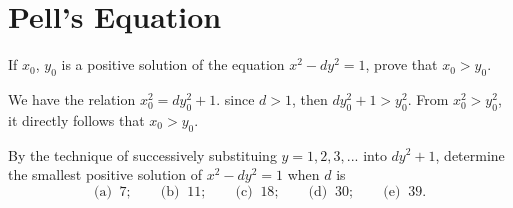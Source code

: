 \section{Pell's Equation}

\begin{exercise}
    If $x_0$, $y_0$ is a positive solution of the equation $x^2 - dy^2 = 1$, prove that $x_0 > y_0$. \\
\end{exercise}

\begin{solution}
    We have the relation $x_0^2 = dy_0^2 + 1$. since $d > 1$, then $dy_0^2 + 1 > y_0^2$. From $x_0^2 > y_0^2$, it directly follows that $x_0 > y_0$. \\
\end{solution}

\begin{exercise}
    By the technique of successively substituing $y = 1, 2, 3, ...$ into $dy^2 + 1$, determine the smallest positive solution of $x^2 - dy^2 = 1$ when $d$ is
    $$\text{(a) } \ 7; \qquad \text{(b) } \ 11; \qquad \text{(c) } \ 18; \qquad \text{(d) } \ 30; \qquad \text{(e) } \ 39.$$ 
\end{exercise}

